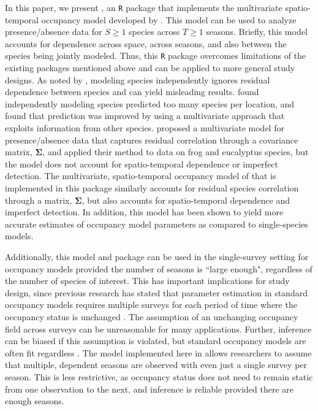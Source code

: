 In this paper, we present , an \texttt{R} package that implements the multivariate spatio-temporal occupancy model developed by \cite{hepler2021spatiotemporal}. 
 This model can be used to analyze presence/absence data for $S \geq 1$ species across $T \geq 1$ seasons. Briefly, this model accounts for dependence across space, across seasons, and also between the species being jointly modeled. Thus, this \texttt{R} package overcomes limitations of the existing packages mentioned above and can be applied to more general study designs. As noted by \cite{taylor2017joint}, modeling species independently ignores residual dependence between species and can yield misleading results. \cite{guisan2011sesam} found independently modeling species predicted too many species per location, and \cite{clark2014more} found that prediction was improved by using a multivariate approach that exploits information from other species.  \cite{pollock2014understanding} proposed a multivariate model for presence/absence data that captures residual correlation through a covariance matrix, $\boldsymbol{\Sigma}$, and applied their method to data on frog and eucalyptus species, but the model does not account for spatio-temporal dependence or imperfect detection. The multivariate, spatio-temporal occupancy model of \cite{hepler2021spatiotemporal} that is implemented in this package similarly accounts for residual species correlation through a matrix, $\boldsymbol{\Sigma}$, but also accounts for spatio-temporal dependence and imperfect detection. In addition, this model has been shown to yield more accurate estimates of occupancy model parameters as compared to single-species models.
 
Additionally, this model and package can be used in the single-survey setting for occupancy models provided the number of seasons is ``large enough", regardless of the number of species of interest.  This has important implications for study design, since previous research has stated that parameter estimation in standard occupancy models requires multiple surveys for each period of time where the occupancy status is unchanged \citep{mackenzie2002}. The assumption of an unchanging occupancy field across surveys can be unreasonable for many applications.  Further, inference can be biased if this assumption is violated, but standard occupancy models are often fit regardless \citep{rota2009occupancy}. The model implemented here in  allows researchers to assume that multiple, dependent seasons are observed with even just a single survey per season.  This is less restrictive, as occupancy status does not need to remain static from one observation to the next, and inference is reliable provided there are enough seasons.

